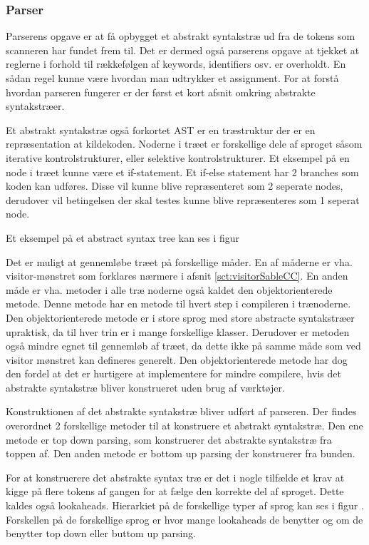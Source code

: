 \subsubsection{Parser}\wip
Parserens opgave er at få opbygget et abstrakt syntakstræ ud fra de tokens som scanneren har fundet frem til. Det er dermed også parserens opgave at tjekket at reglerne i forhold til rækkefølgen af keywords, identifiers osv. er overholdt. En sådan regel kunne være hvordan man udtrykker et assignment. For at forstå hvordan parseren fungerer er der først et kort afsnit omkring abstrakte syntakstræer.

Et abstrakt syntakstræ også forkortet AST er en træstruktur der er en repræsentation at kildekoden. Noderne i træet er forskellige dele af sproget såsom iterative kontrolstrukturer, eller selektive kontrolstrukturer. Et eksempel på en node i træet kunne være et if-statement. Et if-else statement har 2 branches som koden kan udføres. Disse vil kunne blive repræsenteret som 2 seperate nodes, derudover vil betingelsen der skal testes kunne blive repræsenteres som 1 seperat node.

Et eksempel på et abstract syntax tree kan ses i figur

Det er muligt at gennemløbe træet på forskellige måder. En af måderne er vha. visitor-mønstret som forklares nærmere i afsnit \ref{sct:visitorSableCC}. En anden måde er vha. metoder i alle træ noderne også kaldet den objektorienterede metode. Denne metode har en metode til hvert step i compileren i trænoderne. Den objektorienterede metode er i store sprog med  store abstracte syntakstræer upraktisk, da til hver trin er i mange forskellige klasser. Derudover er metoden også mindre egnet til gennemløb af træet, da dette ikke på samme måde som ved visitor mønstret kan defineres generelt. Den objektorienterede metode har dog den fordel at det er hurtigere at implementere for mindre compilere, hvis det abstrakte syntakstræ bliver konstrueret uden brug af værktøjer.

Konstruktionen af det abstrakte syntakstræ bliver udført af parseren. Der findes overordnet 2 forskellige metoder til at konstruere et abstrakt syntakstræ. Den ene metode er top down parsing, som konstruerer det abstrakte syntakstræ fra toppen af. Den anden metode er bottom up parsing der konstruerer fra bunden.

For at konstruerere det abstrakte syntax træ er det i nogle tilfælde et krav at kigge på flere tokens af gangen for at fælge den korrekte del af sproget. Dette kaldes også lookaheads. Hierarkiet på de forskellige typer af sprog kan ses i figur . Forskellen på de forskellige sprog er hvor mange lookaheads de benytter og om de benytter top down eller buttom up parsing.


